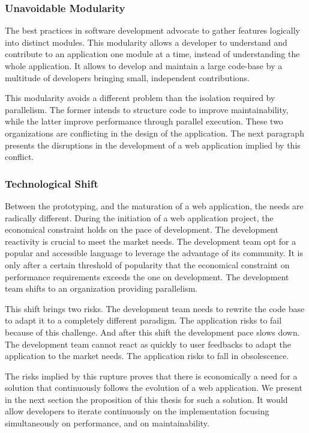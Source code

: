 \subsubsection{Unavoidable Modularity}

The best practices in software development advocate to gather features logically into distinct modules.
This modularity allows a developer to understand and contribute to an application one module at a time, instead of understanding the whole application.
It allows to develop and maintain a large code-base by a multitude of developers bringing small, independent contributions.

This modularity avoids a different problem than the isolation required by parallelism.
The former intends to structure code to improve maintainability, while the latter improve performance through parallel execution.
These two organizations are conflicting in the design of the application.
The next paragraph presents the disruptions in the development of a web application implied by this conflict.

\subsubsection{Technological Shift}

Between the prototyping, and the maturation of a web application, the needs are radically different.
During the initiation of a web application project, the economical constraint holds on the pace of development.
The development reactivity is crucial to meet the market needs.
The development team opt for a popular and accessible language to leverage the advantage of its community.
It is only after a certain threshold of popularity that the  economical constraint on performance requirements exceeds the one on development.
The development team shifts to an organization providing parallelism.

This shift brings two risks.
The development team needs to rewrite the code base to adapt it to a completely different paradigm.
The application risks to fail because of this challenge.
And after this shift the development pace slows down.
The development team cannot react as quickly to user feedbacks to adapt the application to the market needs.
The application risks to fall in obsolescence.

The risks implied by this rupture proves that there is economically a need for a solution that continuously follows the evolution of a web application.
We present in the next section the proposition of this thesis for such a solution.
It would allow developers to iterate continuously on the implementation focusing simultaneously on performance, and on maintainability.

